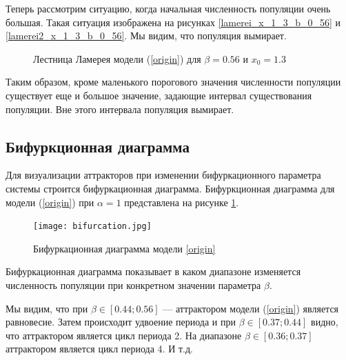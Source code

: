        Теперь рассмотрим ситуацию, когда начальная численность популяции очень большая. Такая ситуация изображена на рисунках \ref{lamerei_x_1_3_b_0_56} и \ref{lamerei2_x_1_3_b_0_56}. Мы видим, что популяция вымирает.

        \begin{figure}
            \centering


            \captionsetup{justification=centering}
            \caption{Лестница Ламерея модели (\ref{origin}) для \(\beta = 0.56\) и \(x_0 = 1.3\)}
        \end{figure}

        Таким образом, кроме маленького порогового значения численности популяции существует еще и большое значение, задающие интервал существования популяции. Вне этого интервала популяция вымирает. 

    \subsection{Бифуркционная диаграмма}    

        Для визуализации аттракторов при изменении бифуркационного параметра системы строится бифуркационная диаграмма. Бифуркционная диаграмма для модели (\ref{origin}) при \(\alpha = 1\) представлена на рисунке \ref{bifurcation}.

        \begin{figure}
            \centering
            \texttt{[image: bifurcation.jpg]}

            \captionsetup{justification=centering}
            \caption{Бифуркационная диаграмма модели \ref{origin}}
            \label{bifurcation}
        \end{figure}

        Бифуркационная диаграмма показывает в каком диапазоне изменяется численность популяции при конкретном значении параметра \(\beta\).

        Мы видим, что при \(\beta \in [0.44; 0.56]\) --- аттрактором модели (\ref{origin}) является равновесие. Затем происходит удвоение периода и при \(\beta \in [0.37; 0.44]\) видно, что аттрактором является цикл периода 2. На диапазоне \(\beta \in [0.36; 0.37]\) аттрактором является цикл периода 4. И т.д.
        
